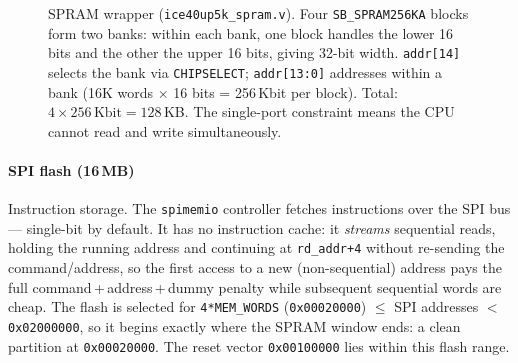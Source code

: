 \documentclass[9pt, a4paper]{extarticle}
\begin{document}
\begin{figure}[htbp]
    \caption{SPRAM wrapper (\texttt{ice40up5k\_spram.v}). Four \texttt{SB\_SPRAM256KA} blocks form two banks: within each bank, one block handles the lower 16 bits and the other the upper 16 bits, giving 32-bit width. \texttt{addr[14]} selects the bank via \texttt{CHIPSELECT}; \texttt{addr[13:0]} addresses within a bank (16K words $\times$ 16 bits = 256\,Kbit per block). Total: $4 \times 256\,\text{Kbit} = 128$\,KB. The single-port constraint means the CPU cannot read and write simultaneously.}
    \label{fig:spram-wiring}
\end{figure}

\paragraph{SPI flash (16\,MB)} Instruction storage. The \texttt{spimemio} controller fetches instructions over the SPI bus --- single-bit by default. It has no instruction cache: it \emph{streams} sequential reads, holding the running address and continuing at \texttt{rd\_addr+4} without re-sending the command/address, so the first access to a new (non-sequential) address pays the full command\,+\,address\,+\,dummy penalty while subsequent sequential words are cheap. The flash is selected for \texttt{4*MEM\_WORDS} (\texttt{0x00020000}) $\leq$ SPI addresses $<$ \texttt{0x02000000}, so it begins exactly where the SPRAM window ends: a clean partition at \texttt{0x00020000}. The reset vector \texttt{0x00100000} lies within this flash range.
\end{document}

